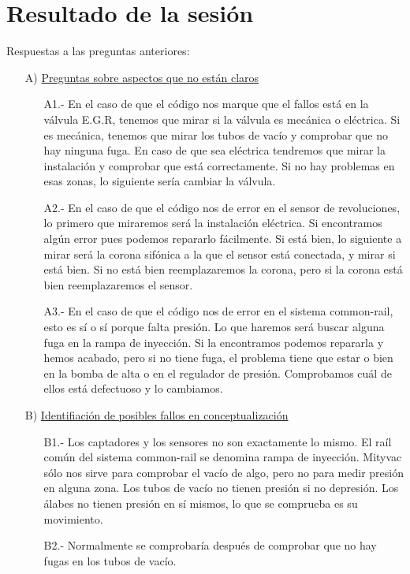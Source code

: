 \documentclass[a4paper,12pt]{article}
\begin{document}
\section{Resultado de la sesión}
Respuestas a las preguntas anteriores:
\begin{itemize}
\item[A)] \underline{Preguntas sobre aspectos que no están claros}
\begin{itemize}
\item[A1.-] En el caso de que el código nos marque que el fallos está en la válvula E.G.R, tenemos que mirar si la válvula es mecánica o eléctrica. Si es mecánica, tenemos que mirar los tubos de vacío y comprobar que no hay ninguna fuga. En caso de que sea eléctrica tendremos que mirar la instalación y comprobar que está correctamente. Si no hay problemas en esas zonas, lo siguiente sería cambiar la válvula. 
\item[A2.-] En el caso de que el código nos de error en el sensor de revoluciones, lo primero que miraremos será la instalación eléctrica. Si encontramos algún error pues podemos repararlo fácilmente. Si está bien, lo siguiente a mirar será la corona sifónica a la que el sensor está conectada, y mirar si está bien. Si no está bien reemplazaremos la corona, pero si la corona está bien reemplazaremos el sensor.
\item[A3.-] En el caso de que el código nos de error en el sistema common-rail, esto es sí o sí porque falta presión. Lo que haremos será buscar alguna fuga en la rampa de inyección. Si la encontramos podemos repararla y hemos acabado, pero si no tiene fuga, el problema tiene que estar o bien en la bomba de alta o en el regulador de presión. Comprobamos cuál de ellos está defectuoso y lo cambiamos.
\end{itemize}
\item[B)] \underline{Identifiación de posibles fallos en conceptualización}
\begin{itemize}
\item[B1.-] Los captadores y los sensores no son exactamente lo mismo. El raíl común del sistema common-rail se denomina rampa de inyección. Mityvac sólo nos sirve para comprobar el vacío de algo, pero no para medir presión en alguna zona. Los tubos de vacío no tienen presión si no depresión. Los álabes no tienen presión en sí mismos, lo que se comprueba es su movimiento.
\item[B2.-] Normalmente se comprobaría después de comprobar que no hay fugas en los tubos de vacío.
\end{itemize}
\end{itemize}
\end{document}
